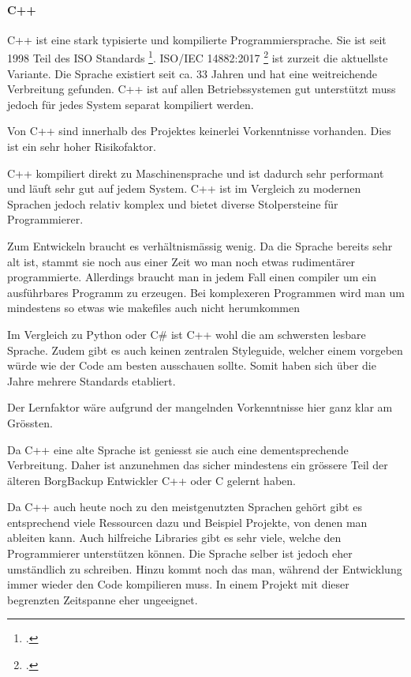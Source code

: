 \paragraph{C++}
\label{sec:org5dffd72}

C++ ist eine stark typisierte und kompilierte Programmiersprache. Sie ist seit
1998 Teil des ISO Standards \footcite{cpp98}. ISO/IEC 14882:2017 \footcite{cpp17}
ist zurzeit die aktuellste Variante. Die Sprache existiert seit ca. 33 Jahren
und hat eine weitreichende Verbreitung gefunden. C++ ist auf allen
Betriebssystemen gut unterstützt muss jedoch für jedes System separat
kompiliert werden.

Von C++ sind innerhalb des Projektes keinerlei Vorkenntnisse vorhanden. Dies
ist ein sehr hoher Risikofaktor.

C++ kompiliert direkt zu Maschinensprache und ist dadurch sehr performant und
läuft sehr gut auf jedem System. C++ ist im Vergleich zu modernen Sprachen
jedoch relativ komplex und bietet diverse Stolpersteine für Programmierer.

Zum Entwickeln braucht es verhältnismässig wenig. Da die Sprache bereits sehr
alt ist, stammt sie noch aus einer Zeit wo man noch etwas rudimentärer
programmierte. Allerdings braucht man in jedem Fall einen \gls{compiler} um ein
ausführbares Programm zu erzeugen. Bei komplexeren Programmen wird man um
mindestens so etwas wie \glspl{makefile} auch nicht herumkommen

Im Vergleich zu Python oder C\# ist C++ wohl die am schwersten lesbare Sprache.
Zudem gibt es auch keinen zentralen Styleguide, welcher einem vorgeben würde wie
der Code am besten ausschauen sollte. Somit haben sich über die Jahre mehrere
Standards etabliert.

Der Lernfaktor wäre aufgrund der mangelnden Vorkenntnisse hier ganz klar am
Grössten.

Da C++ eine alte Sprache ist geniesst sie auch eine dementsprechende
Verbreitung. Daher ist anzunehmen das sicher mindestens ein grössere Teil der
älteren BorgBackup Entwickler C++ oder C gelernt haben.

Da C++ auch heute noch zu den meistgenutzten Sprachen gehört gibt es
entsprechend viele Ressourcen dazu und Beispiel Projekte, von denen man ableiten
kann. Auch hilfreiche Libraries gibt es sehr viele, welche den Programmierer
unterstützen können. Die Sprache selber ist jedoch eher umständlich zu
schreiben. Hinzu kommt noch das man, während der Entwicklung immer wieder den
Code kompilieren muss. In einem Projekt mit dieser begrenzten Zeitspanne eher
ungeeignet.


